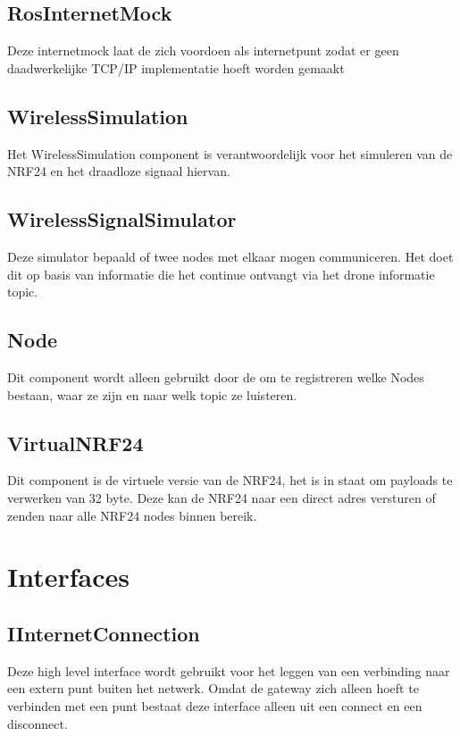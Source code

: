 \documentclass[a4paper, 11pt, oneside]{report}
\begin{document}
\subsection{RosInternetMock}
\label{architectural:subcomponenten:RosInternetMock}
Deze internetmock laat de  zich voordoen als internetpunt zodat er geen daadwerkelijke TCP/IP implementatie hoeft worden gemaakt 
\subsection{WirelessSimulation}
\label{architectural:subcomponenten:WirelessSimulation}
Het WirelessSimulation component is verantwoordelijk voor het simuleren van de NRF24 en het draadloze signaal hiervan. 
\subsection{WirelessSignalSimulator}
\label{architectural:subcomponenten:WirelessSignalSimulator}
Deze simulator bepaald of twee nodes met elkaar mogen communiceren. Het doet dit op basis van informatie die het continue ontvangt via het drone informatie topic. 
\subsection{Node}
\label{architectural:subcomponenten:Node}
Dit component wordt alleen gebruikt door de  om te registreren welke Nodes bestaan, waar ze zijn en naar welk topic ze luisteren.
\subsection{VirtualNRF24}
\label{architectural:subcomponenten:VirtualNRF24}
Dit component is de virtuele versie van de NRF24, het is in staat om payloads te verwerken van 32 byte.
Deze kan de NRF24 naar een direct adres versturen of zenden naar alle NRF24 nodes binnen bereik.

\section{Interfaces}
\label{architectural:interfaces}
\subsection{IInternetConnection}
\label{architectural:interfaces:IInternetConnection}
Deze high level interface wordt gebruikt voor het leggen van een verbinding naar een extern punt buiten het netwerk. Omdat de gateway zich alleen hoeft te verbinden met een punt bestaat deze interface alleen uit een connect en een disconnect.
\end{document}
